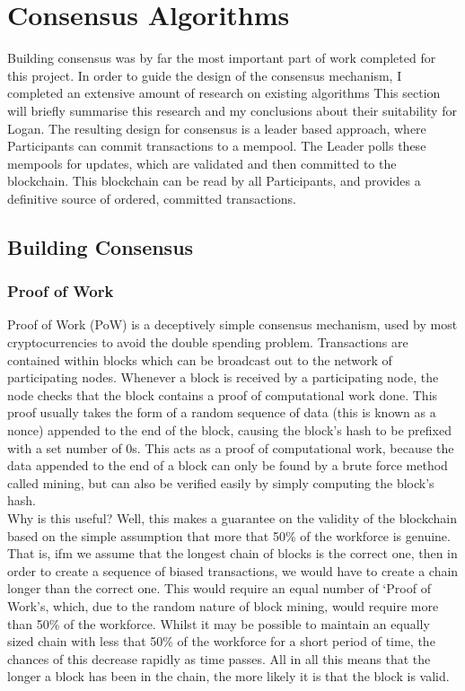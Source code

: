 \documentclass[12pt,a4paper,twoside,openright]{report}
\begin{document}
	\section{Consensus Algorithms}\label{sec:consensus}
	Building consensus was by far the most important part of work completed for this project. 
	In order to guide the design of the consensus mechanism, I completed an extensive amount of research on existing algorithms
	This section will briefly summarise this research and my conclusions about their suitability for Logan. 
	The resulting design for consensus is a leader based approach, where Participants can commit transactions to a mempool.
	The Leader polls these mempools for updates, which are validated and then committed to the blockchain.
	This blockchain can be read by all Participants, and provides a definitive source of ordered, committed transactions.

	\subsection{Building Consensus}
	\subsubsection*{Proof of Work}
	Proof of Work (PoW) is a deceptively simple consensus mechanism, used by most cryptocurrencies to avoid the double spending problem.
	Transactions are contained within blocks which can be broadcast out to the network of participating nodes. 
	Whenever a block is received by a participating node, the node checks that the block contains a proof of computational work done. 
	This proof usually takes the form of a random sequence of data (this is known as a nonce) appended to the end of the block, causing the block's hash to be prefixed with a set number of 0s.
	This acts as a proof of computational work, because the data appended to the end of a block can only be found by a brute force method called mining, but can also be verified easily by simply computing the block's hash.\\
	
	Why is this useful? 
	Well, this makes a guarantee on the validity of the blockchain based on the simple assumption that more that 50\% of the workforce is genuine.
	That is, ifm we assume that the longest chain of blocks is the correct one, then in order to create a sequence of biased transactions, we would have to create a chain longer than the correct one. 
	This would require an equal number of `Proof of Work's, which, due to the random nature of block mining, would require more than 50\% of the workforce.
	Whilst it may be possible to maintain an equally sized chain with less that 50\% of the workforce for a short period of time, the chances of this decrease rapidly as time passes.
	All in all this means that the longer a block has been in the chain, the more likely it is that the block is valid.\\
\end{document}
